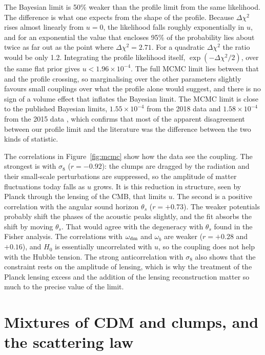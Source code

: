 \documentclass[11pt,a4paper]{article}
\newcommand{\dchi}{\Delta\chi^2}
\begin{document}
The Bayesian limit is 50\% weaker than the profile limit from the same likelihood. The difference is what one expects from the shape of the profile. Because $\dchi$ rises almost linearly from $u=0$, the likelihood falls roughly exponentially in $u$, and for an exponential the value that encloses 95\% of the probability lies about twice as far out as the point where $\dchi = 2.71$. For a quadratic $\dchi$ the ratio would be only 1.2. Integrating the profile likelihood itself, $\exp(-\dchi/2)$, over the same flat prior gives $u < 1.96\times10^{-4}$. The full MCMC limit lies between that and the profile crossing, so marginalising over the other parameters slightly favours small couplings over what the profile alone would suggest, and there is no sign of a volume effect that inflates the Bayesian limit. The MCMC limit is close to the published Bayesian limits, $1.55\times10^{-4}$ from the 2018 data \citep{Zhou2022} and $1.58\times10^{-4}$ from the 2015 data \citep{StadlerBoehm2018}, which confirms that most of the apparent disagreement between our profile limit and the literature was the difference between the two kinds of statistic.

The correlations in Figure~\ref{fig:mcmc} show how the data see the coupling. The strongest is with $\sigma_8$ ($r = -0.92$): the clumps are dragged by the radiation and their small-scale perturbations are suppressed, so the amplitude of matter fluctuations today falls as $u$ grows. It is this reduction in structure, seen by Planck through the lensing of the CMB, that limits $u$. The second is a positive correlation with the angular sound horizon $\theta_s$ ($r = +0.73$). The weaker potentials probably shift the phases of the acoustic peaks slightly, and the fit absorbs the shift by moving $\theta_s$. That would agree with the degeneracy with $\theta_s$ found in the Fisher analysis. The correlations with $\omega_{\rm dm}$ and $\omega_b$ are weaker ($r = +0.28$ and $+0.16$), and $H_0$ is essentially uncorrelated with $u$, so the coupling does not help with the Hubble tension. The strong anticorrelation with $\sigma_8$ also shows that the constraint rests on the amplitude of lensing, which is why the treatment of the Planck lensing excess and the addition of the lensing reconstruction matter so much to the precise value of the limit.

\section{Mixtures of CDM and clumps, and the scattering law}
\label{sec:mixtures}
\end{document}
